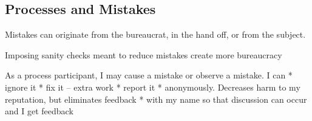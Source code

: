 \subsection{Processes and Mistakes}

Mistakes can originate from the bureaucrat, in the hand off, or from the subject.

Imposing sanity checks meant to reduce mistakes create more bureaucracy 


As a process participant, I may cause a mistake or observe a mistake. 
I can 
* ignore it
* fix it -- extra work
* report it
    * anonymously. Decreases harm to my reputation, but eliminates feedback
    * with my name so that discussion can occur and I get feedback